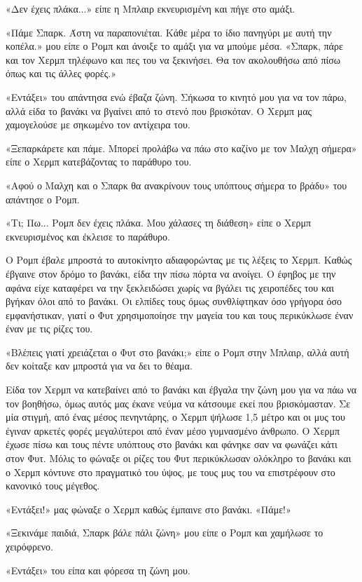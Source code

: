 \documentclass[12pt,twoside, openany]{book}
\begin{document}
«Δεν έχεις πλάκα...» είπε η Μπλαιρ εκνευρισμένη και πήγε στο αμάξι.

«Πάμε Σπαρκ. Άστη να παραπονιέται. Κάθε μέρα το ίδιο πανηγύρι με αυτή την κοπέλα.» μου είπε ο Ρομπ και άνοιξε το αμάξι για να μπούμε μέσα. «Σπαρκ, πάρε και τον Χερμπ τηλέφωνο και πες του να ξεκινήσει. Θα τον ακολουθήσω από πίσω όπως και τις άλλες φορές.»

«Εντάξει» του απάντησα ενώ έβαζα ζώνη. Σήκωσα το κινητό μου για να τον πάρω, αλλά είδα το βανάκι να βγαίνει από το στενό που βρισκόταν. Ο Χερμπ μας χαμογελούσε με σηκωμένο τον αντίχειρα του.

«Ξεπαρκάρετε και πάμε. Μπορεί προλάβω να πάω στο καζίνο με τον Μαλχη σήμερα» είπε ο Χερμπ κατεβάζοντας το παράθυρο του.

«Αφού ο Μαλχη και ο Σπαρκ θα ανακρίνουν τους υπόπτους σήμερα το βράδυ» του απάντησε ο Ρομπ.

«Τι; Πω... Ρομπ δεν έχεις πλάκα. Μου χάλασες τη διάθεση» είπε ο Χερμπ εκνευρισμένος και έκλεισε το παράθυρο.

Ο Ρομπ έβαλε μπροστά το αυτοκίνητο αδιαφορώντας με τις λέξεις το Χερμπ. Καθώς έβγαινε στον δρόμο το βανάκι, είδα την πίσω πόρτα να ανοίγει. Ο έφηβος με την αφάνα είχε καταφέρει να την ξεκλειδώσει χωρίς να βγάλει τις χειροπέδες του και βγήκαν όλοι από το βανάκι. Οι ελπίδες τους όμως συνθλίφτηκαν όσο γρήγορα όσο εμφανήστικαν, γιατί ο Φυτ χρησιμοποίησε την μαγεία του και τους περικύκλωσε έναν έναν με τις ρίζες του.

«Βλέπεις γιατί χρειάζεται ο Φυτ στο βανάκι;» είπε ο Ρομπ στην Μπλαιρ, αλλά αυτή δεν κοίταξε καν μπροστά για να δει το θέαμα.

Είδα τον Χερμπ να κατεβαίνει από το βανάκι και έβγαλα την ζώνη μου για να πάω να τον βοηθήσω, όμως αυτός μας έκανε νεύμα να κάτσουμε εκεί που βρισκόμασταν. Σε μία στιγμή, από ένας μέσος πενηντάρης, ο Χερμπ ψήλωσε 1,5 μέτρο και οι μυς του έγιναν αρκετές φορές μεγαλύτεροι από έναν μέσο γυμνασμένο άνθρωπο. Ο Χερμπ έχωσε πίσω και τους πέντε υπόπτους στο βανάκι και φάνηκε σαν να φωνάζει κάτι στον Φυτ. Μόλις το φώναξε οι ρίζες του Φυτ περικύκλωσαν ολόκληρο το βανάκι και ο Χερμπ κόντυνε στο πραγματικό του ύψος, με τους μυς του να επιστρέφουν στο κανονικό τους μέγεθος.

«Εντάξει!» μας φώναξε ο Χερμπ καθώς έμπαινε στο βανάκι. «Πάμε!»

«Ξεκινάμε παιδιά, Σπαρκ βάλε πάλι ζώνη» μου είπε ο Ρομπ και χαμήλωσε το χειρόφρενο.

«Εντάξει» του είπα και φόρεσα τη ζώνη μου.
\end{document}
